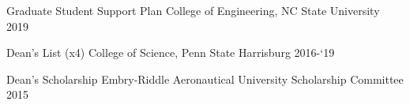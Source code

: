 \begin{cvhonors}



  \cvhonor
    {Graduate Student Support Plan} %
    {College of Engineering, NC State University} %
    {}
    {2019} %

  \cvhonor
    {Dean's List (x4)} %
    {College of Science, Penn State Harrisburg} %
    {} %
    {2016-`19} %

  \cvhonor
    {Dean's Scholarship} %
    {Embry-Riddle Aeronautical University Scholarship Committee} %
    {}
    {2015} %

\end{cvhonors}